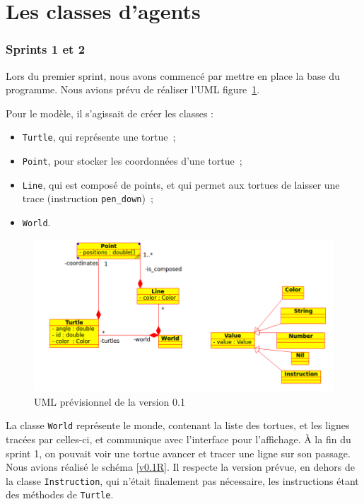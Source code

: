 \section{Les classes d'agents}
\subsubsection{Sprints 1 et 2}
Lors du premier sprint, nous avons commencé par mettre en place la base du programme. Nous avions prévu de réaliser l'UML figure~\ref{v0.1}.

 Pour le modèle, il s'agissait de créer les classes :
\begin{itemize}
\item \verb|Turtle|, qui représente une tortue~;
\item \verb|Point|, pour stocker les coordonnées d'une tortue~;
\item \verb|Line|, qui est composé de points, et qui permet aux tortues de laisser une trace (instruction \verb|pen_down|)~;
\item \verb|World|.
\end{itemize}


\begin{figure}[h]
\centering
\includegraphics[scale=0.5]{doc/report/uml/v01.png}
\caption{\label{v0.1} UML prévisionnel de la version 0.1}
\end{figure}


La classe \verb|World| représente le monde, contenant la liste des tortues, et les lignes tracées par celles-ci, et communique avec l'interface pour l'affichage.
À la fin du sprint 1, on pouvait voir une tortue avancer et tracer une ligne sur son passage.
Nous avions réalisé le schéma \ref{v0.1R}. Il respecte la version prévue, en dehors de la classe \verb|Instruction|, qui n'était finalement pas nécessaire, les instructions étant des méthodes de \verb|Turtle|.


